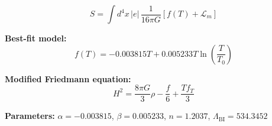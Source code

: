 
\begin{equation}
  S = \int d^4x \, |e| \, \frac{1}{16\pi G} \left[ f(T) + \mathcal{L}_m \right]
\end{equation}

\textbf{Best-fit model:}
\begin{equation}
  f(T) = -0.003815 T + 0.005233 T \ln\!\left(\frac{T}{T_0}\right)
\end{equation}

\textbf{Modified Friedmann equation:}
\begin{equation}
  H^2 = \frac{8\pi G}{3} \rho - \frac{f}{6} + \frac{T f_T}{3}
\end{equation}

\textbf{Parameters:}
$\alpha = -0.003815$, \quad
$\beta = 0.005233$, \quad
$n = 1.2037$, \quad
$\Lambda_{\text{BI}} = 534.3452$